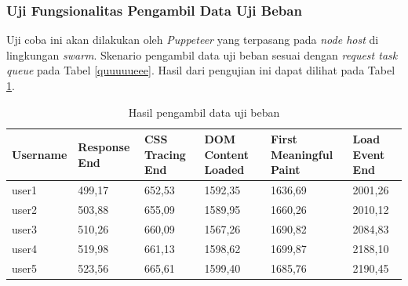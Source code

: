 			\subsubsection{Uji Fungsionalitas Pengambil Data Uji Beban}
				Uji coba ini akan dilakukan oleh \textit{Puppeteer} yang terpasang pada \textit{node host} di lingkungan \textit{swarm}. Skenario pengambil data uji beban sesuai dengan \textit{request task queue} pada Tabel \ref{quuuuueee}. Hasil dari pengujian ini dapat dilihat pada Tabel \ref{dataujibeban}.
				\begin{longtable}{|p{0.15\textwidth}|p{}|p{}|p{}|p{}|p{}|}
					\caption{Hasil pengambil data uji beban} \label{dataujibeban} \\
					\hline
					\textbf{Username} & \textbf{Response End} & \textbf{CSS Tracing End} & \textbf{DOM Content Loaded} & \textbf{First Meaningful Paint} & \textbf{Load Event End} \\ \hline
					\endhead
					\endfoot
					\endlastfoot
					user1 & 499,17 & 652,53 & 1592,35 & 1636,69 & 2001,26 \\ \hline
					user2 & 503,88 & 655,09 & 1589,95 & 1660,26 & 2010,12 \\ \hline
					user3 & 510,26 & 660,09 & 1567,26 & 1690,82 & 2084,83 \\ \hline
					user4 & 519,98 & 661,13 & 1598,62 & 1699,87 & 2188,10 \\ \hline
					user5 & 523,56 & 665,61 & 1599,40 & 1685,76 & 2190,45 \\ \hline
				\end{longtable}
				
